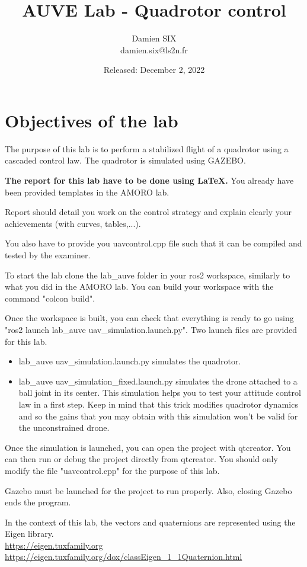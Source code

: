 \documentclass[a4paper]{article}
\title{AUVE Lab - Quadrotor control}
\author{Damien SIX \\ damien.six@ls2n.fr}
\date{Released: December 2, 2022}
\begin{document}
\maketitle

\section{Objectives of the lab}

The purpose of this lab is to perform a stabilized flight of a quadrotor using a cascaded control law. The quadrotor is simulated using GAZEBO.

\textbf{The report for this lab have to be done using \LaTeX.} You already have been provided templates in the AMORO lab.

Report should detail you work on the control strategy and explain clearly your achievements (with curves, tables,...).

You also have to provide you uavcontrol.cpp file such that it can be compiled and tested by the examiner. 

To start the lab clone the lab\_auve folder in your ros2 workspace, similarly to what you did in the AMORO lab. You can build your workspace with the command "colcon build". 

Once the workspace is built, you can check that everything is ready to go using "ros2 launch lab\_auve uav\_simulation.launch.py". Two launch files are provided for this lab. 
\begin{itemize}
	\item lab\_auve uav\_simulation.launch.py simulates the quadrotor.
	\item lab\_auve uav\_simulation\_fixed.launch.py simulates the drone attached to a ball joint in its center. This simulation helps you to test your attitude control law in a first step. Keep in mind that this trick modifies quadrotor dynamics and so the gains that you may obtain with this simulation won't be valid for the unconstrained drone.
\end{itemize}

Once the simulation is launched, you can open the project with qtcreator. You can then run or debug the project directly from qtcreator. You should only modify the file "uavcontrol.cpp" for the purpose of this lab.

Gazebo must be launched for the project to run properly. Also, closing Gazebo ends the program.

In the context of this lab, the vectors and quaternions are represented using the Eigen library.\\
\url{https://eigen.tuxfamily.org}\\
\url{https://eigen.tuxfamily.org/dox/classEigen_1_1Quaternion.html}
\end{document}
